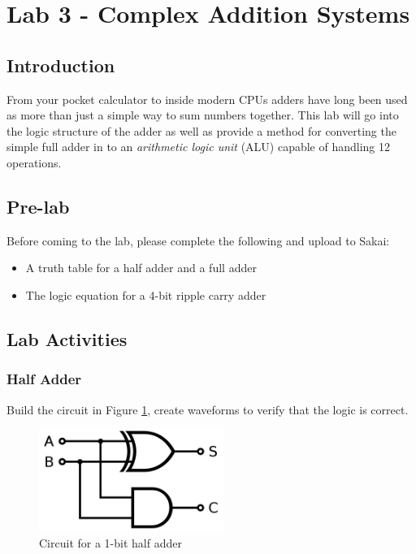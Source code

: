 \section{Lab 3 - Complex Addition Systems}

\subsection{Introduction}
From your pocket calculator to inside modern CPUs adders have long been used as more than just a simple way to sum numbers together. This lab will go into the logic structure of the adder as well as provide a method for converting the simple full adder in to an \emph{arithmetic logic unit} (ALU) capable of handling 12 operations.

\subsection{Pre-lab}
Before coming to the lab, please complete the following and upload to Sakai:
\begin{itemize}
	\item A truth table for a half adder and a full adder
	\item The logic equation for a 4-bit ripple carry adder
\end{itemize}

\subsection{Lab Activities}

\subsubsection{Half Adder}
Build the circuit in Figure \ref{fig:halfadder}, create waveforms to verify that the logic is correct.

\begin{figure}[H]
	\centering
	\includegraphics[width=60mm]{Lab3/figures/halfadder.png}
	\caption{Circuit for a 1-bit half adder}
	\label{fig:halfadder}
\end{figure}

